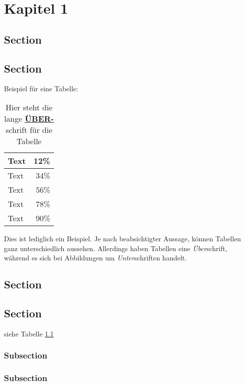 \chapter{Kapitel 1}

\section{Section}

\section{Section}
Beispiel für eine Tabelle:
\begin{table}[ht]
	\centering
	\caption[Kurztitel Tabelle]{Hier steht die lange \underline{\textbf{ÜBER-}}schrift für die Tabelle}

		\vspace{1.0em}
		\begin{tabular}{|l|r|}
\hline
Text & 12\% \\
\hline
Text & 34\% \\
\hline
Text & 56\% \\
\hline
Text & 78\% \\
\hline
Text & 90\% \\
\hline
		\end{tabular}
	\label{tab:tabelle}
\end{table}


\noindent{}Dies ist lediglich ein Beispiel. Je nach beabsichtigter Aussage, können Tabellen ganz unterschiedlich aussehen. Allerdings haben Tabellen eine \emph{Über}schrift, während es sich bei Abbildungen um \emph{Unter}schriften handelt.

\section{Section}

\section{Section}
siehe Tabelle \ref{tab:tabelle}

\subsection{Subsection}

\subsection{Subsection}
